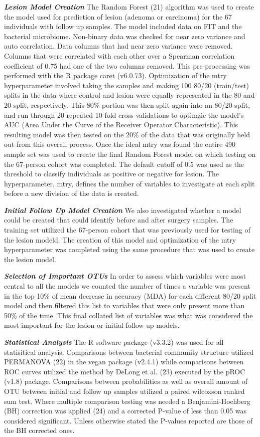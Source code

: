 \documentclass[12pt,]{article}
\begin{document}
\textbf{\emph{Lesion Model Creation}} The Random Forest (21) algorithm
was used to create the model used for prediction of lesion (adenoma or
carcinoma) for the 67 individuals with follow up samples. The model
included data on FIT and the bacterial microbiome. Non-binary data was
checked for near zero variance and auto correlation. Data columns that
had near zero variance were removed. Columns that were correlated with
each other over a Spearman correlation coefficient of 0.75 had one of
the two columns removed. This pre-processing was performed with the R
package caret (v6.0.73). Optimization of the mtry hyperparameter
involved taking the samples and making 100 80/20 (train/test) splits in
the data where control and lesion were equally represented in the 80 and
20 split, respectively. This 80\% portion was then split again into an
80/20 split, and run through 20 repeated 10-fold cross validations to
optimzie the model's AUC (Area Under the Curve of the Receiver Operator
Characteristic). This resulting model was then tested on the 20\% of the
data that was originally held out from this overall process. Once the
ideal mtry was found the entire 490 sample set was used to create the
final Random Forest model on which testing on the 67-person cohort was
completed. The default cutoff of 0.5 was used as the threshold to
classify individuals as positive or negative for lesion. The
hyperparameter, mtry, defines the number of variables to investigate at
each split before a new division of the data is created.

\textbf{\emph{Initial Follow Up Model Creation}} We also investigated
whether a model could be created that could identify before and after
surgery samples. The training set utilized the 67-person cohort that was
previously used for testing of the lesion modeld. The creation of this
model and optimization of the mtry hyperparameter was completed using
the same procedure that was used to create the lesion model.

\textbf{\emph{Selection of Important OTUs}} In order to assess which
variables were most central to all the models we counted the number of
times a variable was present in the top 10\% of mean decrease in
accuracy (MDA) for each different 80/20 split model and then filtered
this list to variables that were only present more than 50\% of the
time. This final collated list of variables was what was considered the
most important for the lesion or initial follow up models.

\textbf{\emph{Statistical Analysis}} The R software package (v3.3.2) was
used for all statisitical analysis. Comparisons between bacterial
community structure utilized PERMANOVA (22) in the vegan package
(v2.4.1) while comparisons between ROC curves utilized the method by
DeLong et al. (23) executed by the pROC (v1.8) package. Comparisons
between probabilities as well as overall amount of OTU between initial
and follow up samples utilized a paired wilcoxson ranked sum test. Where
multiple comparison testing was needed a Benjamini-Hochberg (BH)
correction was applied (24) and a corrected P-value of less than 0.05
was considered significant. Unless otherwise stated the P-values
reported are those of the BH corrected ones.
\end{document}
